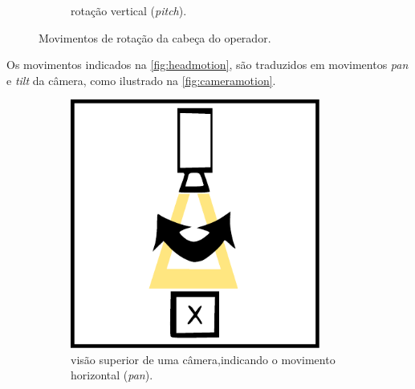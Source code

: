 \begin{figure}[H]
\begin{subfigure}{.5\textwidth}
		\caption{rotação vertical (\textit{pitch}).}
		\label{fig:headmotion_pitch}
	\end{subfigure}
	\caption{Movimentos de rotação da cabeça do operador.}
	\label{fig:headmotion}
\end{figure}

Os movimentos indicados na \autoref{fig:headmotion}, são traduzidos em movimentos \textit{pan} e \textit{tilt} da câmera, como ilustrado na \autoref{fig:cameramotion}.

\begin{figure}[H]
	\centering
	\begin{subfigure}{.5\textwidth}
		\includegraphics[width=0.90\textwidth]{figuras/Pan1.pdf}
		\caption{visão superior de uma câmera,\newline indicando o movimento horizontal (\textit{pan}).}
		\label{fig:cameramotion_pan}
	\end{subfigure}%
	\begin{subfigure}{.5\textwidth}

\end{subfigure}
\end{figure}
